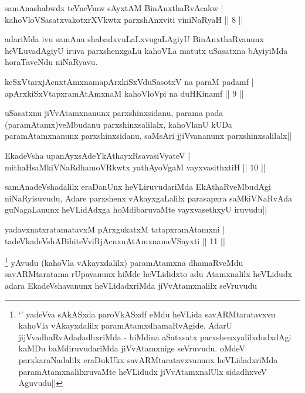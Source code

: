 \begin{shl}
samAnashabwdx teVneVmw sAyxtAM BinAnxthaRvAcakw |\\
kahoVloVSasatxvakotxrXVkwtx parxshAnxviti viniNaRyaH \hfill || 8 ||
\end{shl}

\begin{artha}
adariMda ivu samAna shabadxvuLaLxvugaLAgiyU BinAnxthaRvanunx heVLuvadAgiyU iruva parxshenxgaLu kahoVLa matutx uSasatxna bAyiyiMda horaTaveNdu niNaRyavu.
\end{artha}%


\begin{shl}
keSxVtarxjAcnxtAmxnamapArxkiSxVduSasotxV na paraM padamf |\\
apArxkiSxVtapxramAtAmxnaM kahoVloV\s pi na duHKinamf \hfill || 9 ||
\end{shl}

\begin{artha}
uSasatxnu jiVvAtamxnanunx parxshinxsidanu, parama pada (paramAtamx)veMbudanu parxshinxsalilalx, kahoVlanU kUDa paramAtamxnanunx parxshinxsidanu, saMsAri jjiVvananunx parxshinxsalilalx||
\end{artha}


\begin{shl}
EkadeVsha upanAyxsAdeYkAthayxRsavasiVyateV |\\
mithaHsaMkiVNaRdhamoVRkwtx yathAyoVgaM vayxvasithxtiH \hfill || 10 ||
\end{shl}

\begin{artha}
samAnadeVshadalilx eraDanUnx heVLiruvudariMda EkAthaRveMbudAgi niNaRyisuvudu, Adare parxshenx vAkayxgaLalilx parasapxra saMkiVNaRvAda guNagaLanunx heVLidAdxga hoMdibaruvaMte vayxvasethxyU iruvudu||
\end{artha}

\begin{shl}
yadavxnatxratamatavxM pArxgukatxM tatapxramAtamxni |\\
tadeVkadeVshABihiteVviRjAcnxnAtAmxnameVSayxti \hfill || 11 ||
\end{shl}

\begin{artha}%
\footnote[1]{`\stext ' yadeVva sAkASxda paroVkASxdf \stext eMdu heVLida savARMtaratavxvu kahoVla vAkayxdalilx paramAtamxdhamaRvAgide. AdarU jijVvadhaRvAdadadhxriMda - hiMdina aSatxsatx parxshenxyalilxdudxdAgi kaMDu baMdiruvudariMda jiVvAtamxnige seVruvudu. oMdeV parxkaraNadalilx eraDukUkx savARMtaratavxvanunx heVLidadxriMda paramAtamxnalilxruvaMte heVLidudx jiVvAtamxnalUlx sidadhxveV Aguvudu||} yAvudu (kahoVla vAkayxdalilx) paramAtamxna dhamaRveMdu savARMtaratama rUpavanunx hiMde heVLididxto adu Atamxnalilx heVLidudx adara EkadeVshavanunx heVLidadxriMda jiVvAtamxnalilx seVruvudu
\end{artha}

